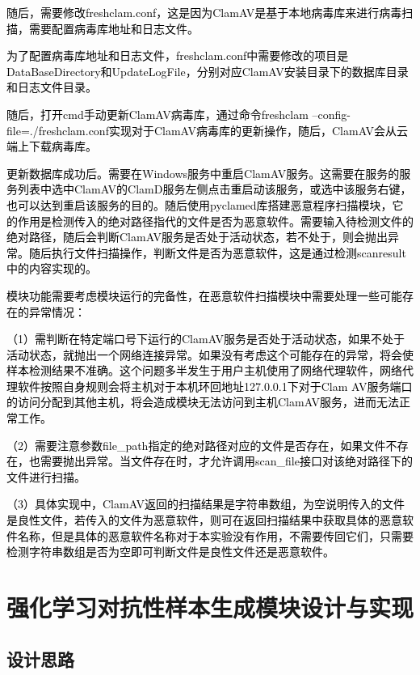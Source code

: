 \textcolor{black}{随后，需要修改freshclam.conf，这是因为ClamAV是基于本地病毒库来进行病毒扫描，需要配置病毒库地址和日志文件。}

\textcolor{black}{为了配置病毒库地址和日志文件，freshclam.conf中需要修改的项目是DataBaseDirectory和UpdateLogFile，分别对应ClamAV安装目录下的数据库目录和日志文件目录。}

\textcolor{black}{随后，打开cmd手动更新ClamAV病毒库，通过命令freshclam –config-file=./freshclam.conf实现对于ClamAV病毒库的更新操作，随后，ClamAV会从云端上下载病毒库。}

\textcolor{black}{更新数据库成功后。需要在Windows服务中重启ClamAV服务。这需要在服务的服务列表中选中ClamAV的ClamD服务左侧点击重启动该服务，或选中该服务右键，也可以达到重启该服务的目的。随后使用pyclamed库搭建恶意程序扫描模块，它的作用是检测传入的绝对路径指代的文件是否为恶意软件。需要输入待检测文件的绝对路径，随后会判断ClamAV服务是否处于活动状态，若不处于，则会抛出异常。随后执行文件扫描操作，判断文件是否为恶意软件，这是通过检测scanresult中的内容实现的。}

\textcolor{black}{模块功能需要考虑模块运行的完备性，在恶意软件扫描模块中需要处理一些可能存在的异常情况：}

\textcolor{black}{（1）需判断在特定端口号下运行的ClamAV服务是否处于活动状态，如果不处于活动状态，就抛出一个网络连接异常。如果没有考虑这个可能存在的异常，将会使样本检测结果不准确。这个问题多半发生于用户主机使用了网络代理软件，网络代理软件按照自身规则会将主机对于本机环回地址127.0.0.1下对于Clam AV服务端口的访问分配到其他主机，将会造成模块无法访问到主机ClamAV服务，进而无法正常工作。}

\textcolor{black}{（2）需要注意参数file\_path指定的绝对路径对应的文件是否存在，如果文件不存在，也需要抛出异常。当文件存在时，才允许调用scan\_file接口对该绝对路径下的文件进行扫描。}

\textcolor{black}{（3）具体实现中，ClamAV返回的扫描结果是字符串数组，为空说明传入的文件是良性文件，若传入的文件为恶意软件，则可在返回扫描结果中获取具体的恶意软件名称，但是具体的恶意软件名称对于本实验没有作用，不需要传回它们，只需要检测字符串数组是否为空即可判断文件是良性文件还是恶意软件。}

\section{强化学习对抗性样本生成模块设计与实现}

\subsection{设计思路}

